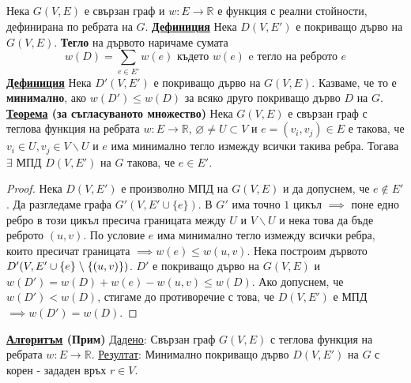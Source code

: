 \documentclass{article}
\begin{document}
\subsection*{\color{lightBlue}{7. Алгоритми в графи с тегла на ребрата. Оценки за сложност.}}
Нека $G(V, E)$ е свързан граф и $w : E \rightarrow \mathbb{R}$ е функция с реални стойности, дефинирана по ребрата на $G$. \newline\newline
\textbf{\underline{Дефиниция}}
Нека $D(V, E')$ е покриващо дърво на $G(V, E)$. \textbf{Тегло} на дървото наричаме сумата $$w(D) = \sum_{e \in E'}w(e) \text{ където } w(e) \text{ e тегло на реброто } e$$
\textbf{\underline{Дефиниция}}
Нека $D'(V, E')$ е покриващо дърво на $G(V, E)$. Казваме, че то е \textbf{минимално}, ако $w(D') \le w(D)$ за всяко друго покриващо дърво $D$ на $G$. \newline\newline
\textbf{\underline{Теорема} (за съгласуваното множество)} \newline
Нека $G(V, E)$ е свързан граф с теглова функция на ребрата $w : E \rightarrow \mathbb{R}$, $\varnothing \neq U \subset V$ и $e = (v_i, v_j) \in E$
е такова, че $v_i \in U, v_j \in V \backslash U$ и $e$ има минимално тегло измежду всички такива ребра. Тогава $\exists$ МПД $D(V, E')$
на $G$ такова, че $e \in E'$.
\begin{proof}
Нека $D(V, E')$ е произволно МПД на $G(V, E)$ и да допуснем, че $e \notin E'$. Да разгледаме графа $G'(V, E' \cup \{e\})$. В $G'$ има точно $1$ цикъл
$\implies$ поне едно ребро в този цикъл пресича границата между $U$ и $V \backslash U$ и нека това да бъде реброто $(u, v)$. По условие $e$ има минимално тегло
измежду всички ребра, които пресичат границата $\implies w(e) \leq w(u, v)$. \newline Нека построим дървото $D'(V, E' \cup \{e\} \hspace{0.1cm} \backslash
\hspace{0.1cm}\{(u, v)\})$. $D'$ е покриващо дърво на $G(V, E)$ и $w(D') = w(D) + w(e) - w(u, v)\leq w(D)$. Ако допуснем, че $w(D') < w(D)$,
стигаме до противоречие с това, че $D(V, E')$ е МПД $\implies w(D') = w(D)$.
\end{proof}
\textbf{\underline{Алгоритъм} (Прим)} \newline\newline
\underline{Дадено}: Свързан граф $G(V, E)$ с теглова функция на ребрата $w : E \rightarrow \mathbb{R}$. \newline
\underline{Резултат}: Минимално покриващо дърво $D(V, E')$ на $G$ с корен - зададен връх $r \in V$. \newline
\end{document}
